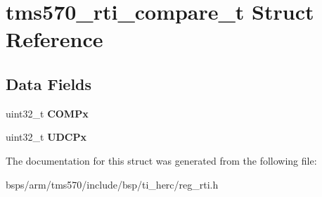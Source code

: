\hypertarget{structtms570__rti__compare__t}{}\section{tms570\+\_\+rti\+\_\+compare\+\_\+t Struct Reference}
\label{structtms570__rti__compare__t}
\subsection*{Data Fields}
\begin{DoxyCompactItemize}
\item 
\mbox{\label{structtms570__rti__compare__t_a5f9be26e4c4ed5cd47be0d5f5416f3a3}} 
uint32\+\_\+t {\bfseries C\+O\+M\+Px}
\item 
\mbox{\label{structtms570__rti__compare__t_a053e411af78fe7d2ae4bd5a5c4482329}} 
uint32\+\_\+t {\bfseries U\+D\+C\+Px}
\end{DoxyCompactItemize}


The documentation for this struct was generated from the following file\+:\begin{DoxyCompactItemize}
\item 
bsps/arm/tms570/include/bsp/ti\+\_\+herc/reg\+\_\+rti.\+h\end{DoxyCompactItemize}
